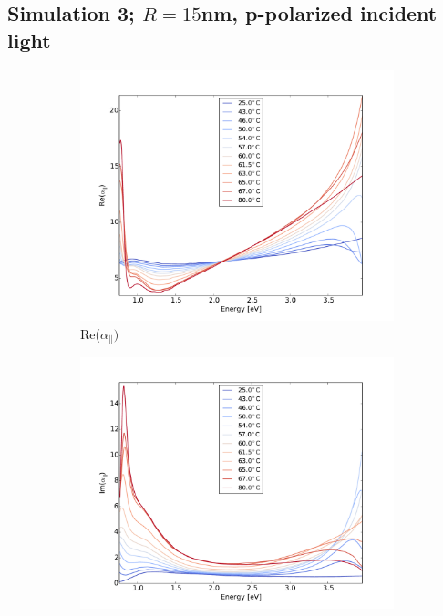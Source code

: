 \newpage
\subsection{Simulation 3; $R = 15$nm, p-polarized incident light}

%
\begin{figure}[h!]
    \centering
    \begin{subfigure}[b]{0.49\textwidth}
        \centering
        \includegraphics[width=\textwidth]{Results/Sim3/re_alpha_parallel.pdf}
        \caption{Re($\alpha_{\parallel})$}
        \label{fig:2}
    \end{subfigure}
    \begin{subfigure}[b]{0.49\textwidth}
        \centering
        \includegraphics[width=\textwidth]{Results/Sim3/im_alpha_parallel.pdf}

\end{subfigure}
\end{figure}
